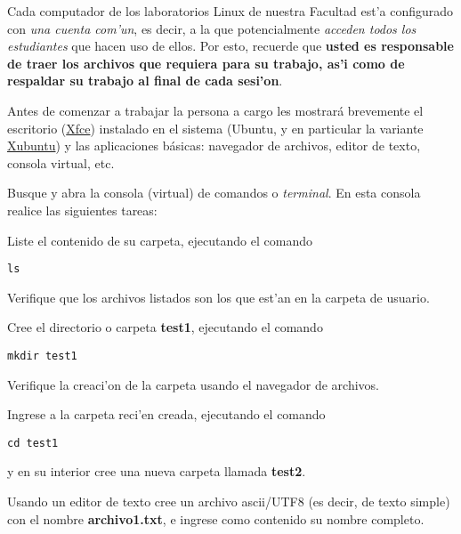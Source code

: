 \documentclass[11pt]{exam}
\begin{document}
\begin{questions}

\item Cada computador de los laboratorios Linux de nuestra Facultad est'a configurado con \textit{una cuenta com'un}, es decir, a la que potencialmente \textit{acceden todos los estudiantes} que hacen uso de ellos. Por esto, recuerde que \textbf{usted es responsable de traer los archivos que requiera para su trabajo, as'i como de respaldar su trabajo al final de cada sesi'on}.

\item Antes de comenzar a trabajar la persona a cargo les mostrar\'a brevemente
el escritorio (\href{http://www.xfce.org/?lang=es}{Xfce}) instalado en el sistema (Ubuntu, y en particular la variante \href{http://xubuntu.org/}{Xubuntu}) y las aplicaciones b\'asicas: navegador de archivos, editor de texto, consola virtual, etc.

\item Busque y abra la consola (virtual) de comandos o \textit{terminal}. En esta consola realice las siguientes tareas:
\begin{parts}
\item Liste el contenido de su carpeta, ejecutando el comando 

\begin{verbatim}
ls
\end{verbatim}

Verifique que los archivos listados son los que est'an en la carpeta de usuario.

\item Cree el directorio o carpeta \textbf{test1}, ejecutando el comando 

\begin{verbatim}
mkdir test1
\end{verbatim}

Verifique la creaci'on de la carpeta usando el navegador de archivos.

\item Ingrese a la carpeta reci'en creada, ejecutando el comando 

\begin{verbatim}
cd test1
\end{verbatim}

y en su interior cree una nueva carpeta llamada \textbf{test2}.

\item Usando un editor de texto cree un archivo ascii/UTF8 (es decir, de texto simple) con el nombre \textbf{archivo1.txt}, e ingrese como contenido su nombre completo.


\end{parts}
\end{questions}
\end{document}
